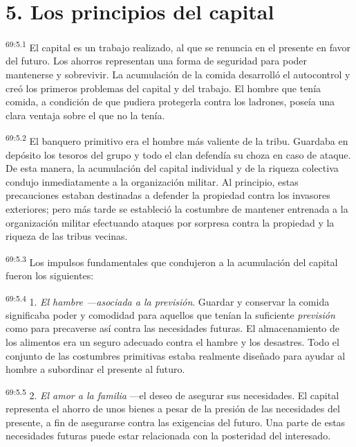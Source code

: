 \section*{5. Los principios del capital}
\par
\textsuperscript{69:5.1} El capital es un trabajo realizado, al que se renuncia en el presente en favor del futuro. Los ahorros representan una forma de seguridad para poder mantenerse y sobrevivir. La acumulación de la comida desarrolló el autocontrol y creó los primeros problemas del capital y del trabajo. El hombre que tenía comida, a condición de que pudiera protegerla contra los ladrones, poseía una clara ventaja sobre el que no la tenía.

\par
\textsuperscript{69:5.2} El banquero primitivo era el hombre más valiente de la tribu. Guardaba en depósito los tesoros del grupo y todo el clan defendía su choza en caso de ataque. De esta manera, la acumulación del capital individual y de la riqueza colectiva condujo inmediatamente a la organización militar. Al principio, estas precauciones estaban destinadas a defender la propiedad contra los invasores exteriores; pero más tarde se estableció la costumbre de mantener entrenada a la organización militar efectuando ataques por sorpresa contra la propiedad y la riqueza de las tribus vecinas.

\par
\textsuperscript{69:5.3} Los impulsos fundamentales que condujeron a la acumulación del capital fueron los siguientes:

\par
\textsuperscript{69:5.4} 1. \textit{El hambre ---asociada a la previsión}. Guardar y conservar la comida significaba poder y comodidad para aquellos que tenían la suficiente \textit{previsión} como para precaverse así contra las necesidades futuras. El almacenamiento de los alimentos era un seguro adecuado contra el hambre y los desastres. Todo el conjunto de las costumbres primitivas estaba realmente diseñado para ayudar al hombre a subordinar el presente al futuro.

\par
\textsuperscript{69:5.5} 2. \textit{El amor a la familia} ---el deseo de asegurar sus necesidades. El capital representa el ahorro de unos bienes a pesar de la presión de las necesidades del presente, a fin de asegurarse contra las exigencias del futuro. Una parte de estas necesidades futuras puede estar relacionada con la posteridad del interesado.

